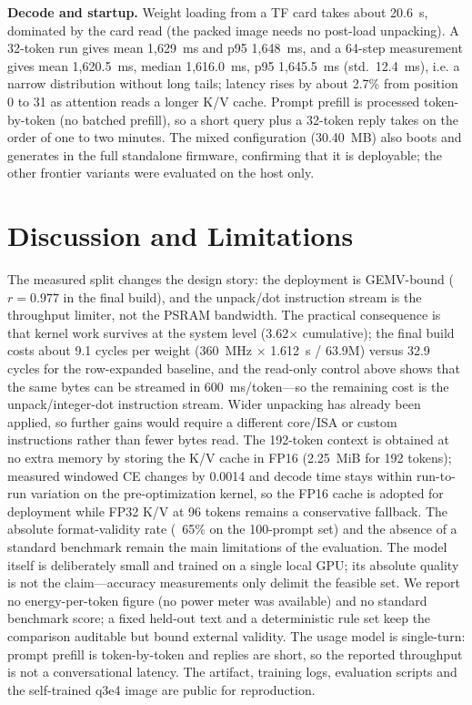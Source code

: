 \documentclass[journal,letterpaper]{IEEEtran}
\begin{document}
\textbf{Decode and startup.} Weight loading from a TF card takes about 20.6~s, dominated by the
card read (the packed image needs no post-load unpacking). A 32-token run gives mean 1,629~ms and
p95 1,648~ms, and a 64-step measurement gives mean 1,620.5~ms, median 1,616.0~ms, p95
1,645.5~ms (std.\ 12.4~ms), i.e. a narrow distribution without long tails; latency rises by about
2.7\% from position 0 to 31 as attention reads a longer K/V cache. Prompt prefill is processed
token-by-token (no batched prefill), so a short query plus a 32-token reply takes on the order of
one to two minutes. The mixed configuration (30.40~MB) also boots and generates in the full
standalone firmware, confirming that it is deployable; the other frontier variants were evaluated
on the host only.

\section{Discussion and Limitations}
The measured split changes the design story: the deployment is GEMV-bound ($r=0.977$ in the
final build), and the unpack/dot instruction stream is the throughput limiter, not the PSRAM
bandwidth. The practical consequence is that kernel work survives at the system level
(3.62$\times$ cumulative); the final build costs about 9.1 cycles per weight
(360~MHz $\times$ 1.612~s / 63.9M) versus 32.9 cycles for the row-expanded baseline, and the
read-only control above shows that the same bytes can be streamed in 600~ms/token---so the
remaining cost is the unpack/integer-dot instruction stream. Wider unpacking has already been
applied, so further gains would require a different core/ISA or custom instructions rather than
fewer bytes read. The 192-token context is obtained at no extra memory by storing the K/V cache in FP16
(2.25~MiB for 192 tokens); measured windowed CE changes by 0.0014 and decode time stays within run-to-run variation on
the pre-optimization kernel, so the FP16 cache is adopted for deployment while FP32 K/V at 96
tokens remains a conservative fallback. The absolute format-validity rate (~65\% on the
100-prompt set) and the absence of a standard benchmark remain the main limitations of the
evaluation. The model itself is deliberately small and trained on a single local GPU; its absolute
quality is not the claim---accuracy measurements only delimit the feasible set. We report no
energy-per-token figure (no power meter was available) and no standard benchmark score; a fixed
held-out text and a deterministic rule set keep the comparison auditable but bound external
validity. The usage model is single-turn: prompt prefill is token-by-token and replies are
short, so the reported throughput is not a conversational latency. The artifact,
training logs, evaluation scripts and the self-trained q3e4 image are public for reproduction.
\end{document}
